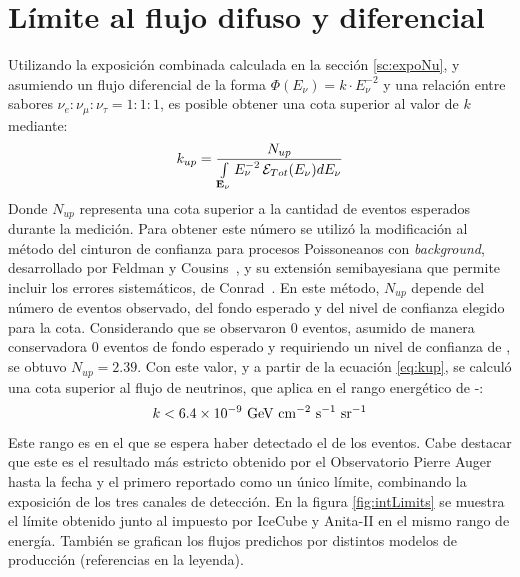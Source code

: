 	\section{L\'imite al flujo difuso y diferencial}
	\label{sc:limiteAuger}
	Utilizando la exposici\'on combinada calculada en la secci\'on \ref{sc:expoNu}, y asumiendo un flujo diferencial de la forma $\Phi(E_\nu)= k\cdot E_\nu^{-2}$ y una relaci\'on entre sabores $\nu_e:\nu_\mu:\nu_\tau=1:1:1$, es posible obtener una cota superior al valor de $k$ mediante:
	\begin{equation}
	 k_{up}=\frac{N_{up}}{\int\limits_{\mathbf{E_{\nu}}} E_\nu^{-2}\,{\cal E}_{Tot}(E_\nu) dE_\nu}
	 \label{eq:kup}
	\end{equation}
	Donde $N_{up}$ representa una cota superior a la cantidad de eventos esperados durante la medici\'on.
	Para obtener este n\'umero se utiliz\'o la modificaci\'on al m\'etodo del cinturon de confianza para procesos Poissoneanos con \emph{background}, desarrollado por Feldman y Cousins~\cite{cite:Feldman-Cousins}, y su extensi\'on semibayesiana que permite incluir los errores sistem\'aticos, de Conrad~\cite{cite:Conrad_limit}.
	En este m\'etodo, $N_{up}$ depende del n\'umero de eventos observado, del fondo esperado y del nivel de confianza elegido para la cota.
	Considerando que se observaron 0 eventos, asumido de manera conservadora 0 eventos de fondo esperado y requiriendo un nivel de confianza de , se obtuvo $N_{up}=2.39$.
	Con este valor, y a partir de la ecuaci\'on \ref{eq:kup}, se calcul\'o una cota superior al flujo de neutrinos, que aplica en el rango energ\'etico de -:
	\begin{equation}
	k < 6.4 \times 10^{-9}~{\rm GeV~cm^{-2}~s^{-1}~sr^{-1}}
	\label{eq:limitePosta}
	\end{equation}
	Este rango es en el que se espera haber detectado el  de los eventos.
	Cabe destacar que este es el resultado m\'as estricto obtenido por el Observatorio Pierre Auger hasta la fecha y el primero reportado como un \'unico l\'imite, combinando la exposici\'on de los tres canales de detecci\'on.
	En la figura \ref{fig:intLimits} se muestra el límite obtenido junto al impuesto por IceCube y Anita-II en el mismo rango de energía.
	Tambi\'en se grafican los flujos predichos por distintos modelos de producci\'on (referencias en la leyenda).
